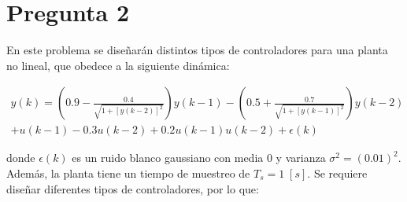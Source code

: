 \section{Pregunta 2}

En este problema se diseñarán distintos tipos de controladores para una planta no lineal, que obedece a la siguiente dinámica:

\begin{align}
y(k) = \left(0.9 - \frac{0.4}{\sqrt{1 + [y(k - 2)]^2}}\right) y(k - 1) - \left(0.5 + \frac{0.7}{\sqrt{1 + [y(k - 1)]^2}}\right) y(k - 2) \\
+ u(k - 1) - 0.3u(k - 2) + 0.2u(k - 1)u(k - 2) + \epsilon(k)
\end{align}

donde \(\epsilon(k)\) es un ruido blanco gaussiano con media \(0\) y varianza \(\sigma^2 = (0.01)^2\). Además, la planta tiene un tiempo de muestreo de \(T_s = 1 \; [s]\). Se requiere diseñar diferentes tipos de controladores, por lo que:

